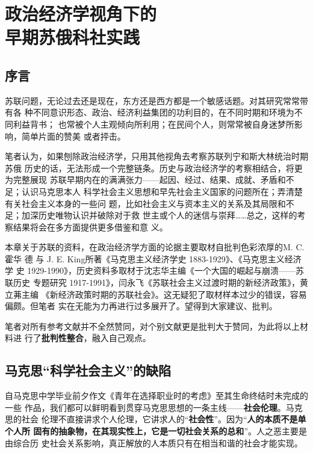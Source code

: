 \chapter[早期苏俄科社实践]{政治经济学视角下的\\早期苏俄科社实践}
\label{chap:russiachina}

\section{序言}

苏联问题，无论过去还是现在，东方还是西方都是一个敏感话题。对其研究常常带有各
种不同意识形态、政治、经济利益集团的功利目的，在不同时期和环境为不同利益背书；
也常被个人主观倾向所利用；在民间个人，则常常被自身迷梦所影响，简单片面的赞美
或者抨击。

笔者认为，如果刨除政治经济学，只用其他视角去考察苏联列宁和斯大林统治时期苏俄
历史的话，无法形成一个完整链条。历史与政治经济学的考察相结合，将更为完整展现
苏联早期内在的满满张力——起因、经过、结果、成就、矛盾和不足；认识马克思本人
科学社会主义思想和早先社会主义国家的问题所在；弄清楚有关社会主义本身的一些问
题，比如社会主义与资本主义的关系及其局限和不足；加深历史唯物认识并破除对于救
世主或个人的迷信与崇拜……总之，这样的考察结果将会在多方面提供更多借鉴和意
义。

本章关于苏联的资料，在政治经济学方面的论据主要取材自批判色彩浓厚的M. C. 霍华
德 与 J. E. King所著《马克思主义经济学史 1883-1929》、《马克思主义经济学
史 1929-1990》，历史资料多取材于沈志华主编《一个大国的崛起与崩溃——苏联历史
专题研究 1917-1991》，闫永飞《苏联社会主义过渡时期的新经济政策》，黄立茀主编
《新经济政策时期的苏联社会》。这无疑犯了取材样本过少的错误，容易偏颇。但笔者
实在无能为力再进行过多展开了。望得到大家建议、批判。

笔者对所有参考文献并不全然赞同，对个别文献更是批判大于赞同，为此将以上材料进
行了\textbf{批判性整合}，融入自己观点。

\section{马克思“科学社会主义”的缺陷}
\label{sec:marxkexue}

自马克思中学毕业前夕作文《青年在选择职业时的考虑》至其生命终结时未完成的一些
作品，我们都可以鲜明看到贯穿马克思思想的一条主线——\textbf{社会伦理}。马克思的社会
伦理不直接讲求个人伦理，它讲求人的“\textbf{社会性}”。因为“\textbf{人的本质不是单个人所
  固有的抽象物，在其现实性上，它是一切社会关系的总和}”。人之恶主要是由综合历
史社会关系影响，真正解放的人本质只有在相当和谐的社会才能实现。

